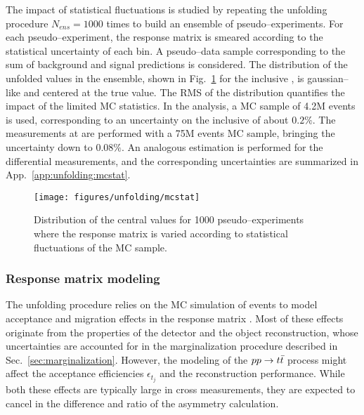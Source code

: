 The impact of statistical fluctuations is studied by repeating the
unfolding procedure $N_{ens}=1000$ times to build an ensemble of
pseudo--experiments. For each pseudo--experiment, the response matrix
is smeared according to the statistical uncertainty of each bin. A
pseudo--data sample corresponding to the sum of background and signal
predictions is considered. The distribution of the unfolded \ac{}
values in the ensemble, shown in Fig.~\ref{fig:mcstat} for the
inclusive \ac{} \eighttev{}, is gaussian--like and centered at the
true \ac{} value. The RMS of the distribution quantifies the impact
of the limited MC statistics. In the \seventev{} analysis, a MC sample
of 4.2M \ttbar{} events is used, corresponding to an uncertainty on the
inclusive \ac{} of about $0.2\%$. The measurements at \eighttev{} are
performed with a 75M events MC sample, bringing the uncertainty down to
$0.08\%$. An analogous estimation is performed for the differential
measurements, and the corresponding uncertainties are summarized in
App.~\ref{app:unfolding:mcstat}.

\begin{figure}[!htb]\centering
  \texttt{[image: figures/unfolding/mcstat]}
  \caption{Distribution of the \ac{} central values for 1000
    pseudo--experiments where the response matrix is varied
    according to statistical fluctuations of the MC sample.}
  \label{fig:mcstat}
\end{figure}

\subsubsection{Response matrix modeling}

The unfolding procedure relies on the MC simulation of \ttbar{} events
to model acceptance and migration effects in the response matrix
\TrasfMatrix{}. Most of these effects originate from the properties of
the detector and the object reconstruction, whose uncertainties are
accounted for in the marginalization procedure described in
Sec.~\ref{sec:marginalization}. However, the modeling of the
$pp\to t\bar{t}{}$ process might affect the acceptance efficiencies
$\epsilon_{t_j}$ and the reconstruction performance. While both these
effects are typically large in cross measurements, they are expected
to cancel in the difference and ratio of the asymmetry calculation.

